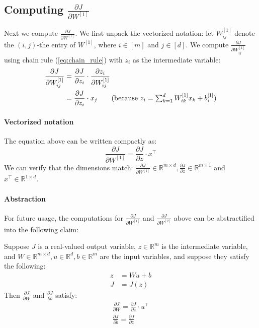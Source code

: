 \subsection{Computing $\frac{\partial J}{\partial W^{[1]}}$}
Next we compute $\frac{\partial J}{\partial W^{[1]}}$. We first unpack the vectorized
notation: let $W^{[1]}_{ij}$
denote the $(i,j)$-the entry of $W^{[1]}$, where $i \in [m]$ and
$j \in [d]$. We compute
$\frac{\partial J}{\partial W^{[1]}_{ij}}$
using chain rule (\cref{eq:chain_rule}) with $z_i$ as the intermediate
variable:
\begin{align*}
    \frac{\partial J}{\partial W^{[1]}_{ij}} &= \frac{\partial J}{\partial z_i} \cdot \frac{\partial z_i}{\partial W^{[1]}_{ij}}\\
    &= \frac{\partial J}{\partial z_i} \cdot x_j \tag{because $z_i = \sum^d_{k=1} W^{[1]}_{ik} x_k + b^{[1]}_i$}
\end{align*}

\paragraph{Vectorized notation} The equation above can be written compactly as:
\begin{equation}
    \frac{\partial J}{\partial W^{[1]}} = \frac{\partial J}{\partial z} \cdot x^\top\label{eq:backprob_vectorized}
\end{equation}
We can verify that the dimensions match:
$\frac{\partial J}{\partial W^{[1]}} \in \mathbb{R}^{m \times d},
\frac{\partial J}{\partial z} \in \mathbb{R}^{m \times 1}$ and
$x^\top \in \mathbb{R}^{1 \times d}$.

\paragraph{Abstraction} For future usage, the computations for
$\frac{\partial J}{\partial W^{[1]}}$
and
$\frac{\partial J}{\partial W^{[2]}}$
above can be abstractified into the following claim:

\begin{claim}\label{cl:claim1}
    Suppose $J$ is a real-valued output variable, $z \in \mathbb{R}^m$ is the
    intermediate variable, and $W \in \mathbb{R}^{m \times d} ,u \in \mathbb{R}^d ,b \in \mathbb{R}^m$ are the input variables,
    and suppose they satisfy the following:
    \begin{align*}
        z &= Wu + b\\
        J &= J(z)
    \end{align*}
    Then $\frac{\partial J}{\partial W}$ and $\frac{\partial J}{\partial b}$ satisfy:
    \begin{align*}
        \frac{\partial J}{\partial W} = \frac{\partial J}{\partial z} \cdot u^\top\\
        \frac{\partial J}{\partial b} = \frac{\partial J}{\partial z}
    \end{align*}
\end{claim}

